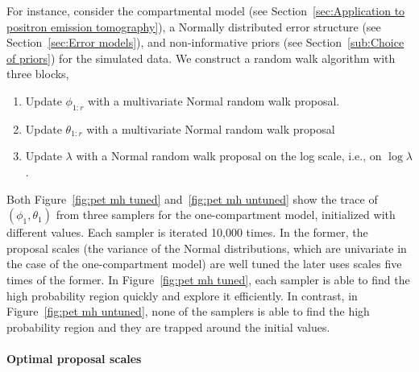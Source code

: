 For instance, consider the \pet compartmental model (see Section~\ref{sec:Application to positron emission tomography}), a Normally distributed error structure (see Section~\ref{sec:Error models}), and non-informative priors (see Section~\ref{sub:Choice of priors}) for the simulated data. We construct a random walk algorithm with three blocks,
\begin{enumerate}
  \item Update $\phi_{1:r}$ with a multivariate Normal random walk proposal.
  \item Update $\theta_{1:r}$ with a multivariate Normal random walk proposal
  \item Update $\lambda$ with a Normal random walk proposal on the log scale,
    i.e., on $\log\lambda$.
\end{enumerate}
Both Figure~\ref{fig:pet mh tuned} and~\ref{fig:pet mh untuned} show the trace of $(\phi_1, \theta_1)$ from three samplers for the one-compartment model, initialized with different values. Each sampler is iterated 10,000 times. In the former, the proposal scales (the variance of the Normal distributions, which are univariate in the case of the one-compartment model) are well tuned  the later uses scales five times of the former. In Figure~\ref{fig:pet mh tuned}, each sampler is able to find the high probability region quickly and explore it efficiently. In contrast, in Figure~\ref{fig:pet mh untuned}, none of the samplers is able to find the high probability region and they are trapped around the initial values.




\paragraph{Optimal proposal scales}

